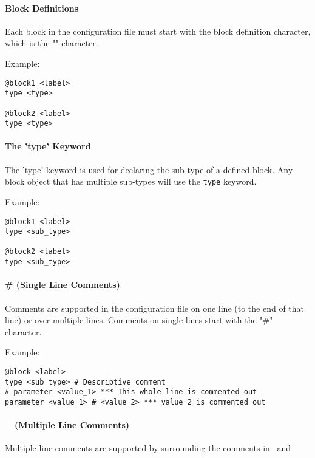 \paragraph*{Block Definitions}

Each block in the configuration file must start with the block definition character, which is the "\command" character.

Example:

{\small{\begin{verbatim}
@block1 <label>
type <type>

@block2 <label>
type <type>
\end{verbatim}}}

\paragraph*{The 'type' Keyword}

The 'type' keyword is used for declaring the sub-type of a defined block. Any block object that has multiple sub-types will use the \texttt{type} keyword.

Example:

{\small{\begin{verbatim}
@block1 <label>
type <sub_type>

@block2 <label>
type <sub_type>
\end{verbatim}}}

\paragraph*{\# (Single Line Comments)}

Comments are supported in the configuration file on one line (to the end of that line) or over multiple lines.  Comments on single lines start with the "\#" character.

Example:

{\small{\begin{verbatim}
@block <label>
type <sub_type> # Descriptive comment
# parameter <value_1> *** This whole line is commented out
parameter <value_1> # <value_2> *** value_2 is commented out
\end{verbatim}}}

\paragraph*{\commentstart\ \commentend\ (Multiple Line Comments)}

Multiple line comments are supported by surrounding the comments in \commentstart\ and \commentend

